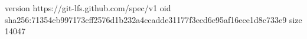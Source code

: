 version https://git-lfs.github.com/spec/v1
oid sha256:71354cb997173cff2576d1b232a4ccadde31177f3ecd6e95af16ece1d8c733e9
size 14047
